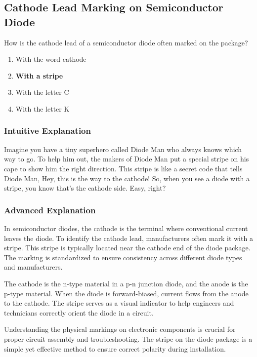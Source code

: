 \subsection{Cathode Lead Marking on Semiconductor Diode}
\label{T6B06}

\begin{tcolorbox}[colback=gray!10!white,colframe=black!75!black,title=T6B06]
How is the cathode lead of a semiconductor diode often marked on the package?
\begin{enumerate}[label=\Alph*)]
    \item With the word cathode
    \item \textbf{With a stripe}
    \item With the letter C
    \item With the letter K
\end{enumerate}
\end{tcolorbox}

\subsubsection{Intuitive Explanation}
Imagine you have a tiny superhero called Diode Man who always knows which way to go. To help him out, the makers of Diode Man put a special stripe on his cape to show him the right direction. This stripe is like a secret code that tells Diode Man, Hey, this is the way to the cathode! So, when you see a diode with a stripe, you know that's the cathode side. Easy, right?

\subsubsection{Advanced Explanation}
In semiconductor diodes, the cathode is the terminal where conventional current leaves the diode. To identify the cathode lead, manufacturers often mark it with a stripe. This stripe is typically located near the cathode end of the diode package. The marking is standardized to ensure consistency across different diode types and manufacturers.

The cathode is the n-type material in a p-n junction diode, and the anode is the p-type material. When the diode is forward-biased, current flows from the anode to the cathode. The stripe serves as a visual indicator to help engineers and technicians correctly orient the diode in a circuit.

Understanding the physical markings on electronic components is crucial for proper circuit assembly and troubleshooting. The stripe on the diode package is a simple yet effective method to ensure correct polarity during installation.

